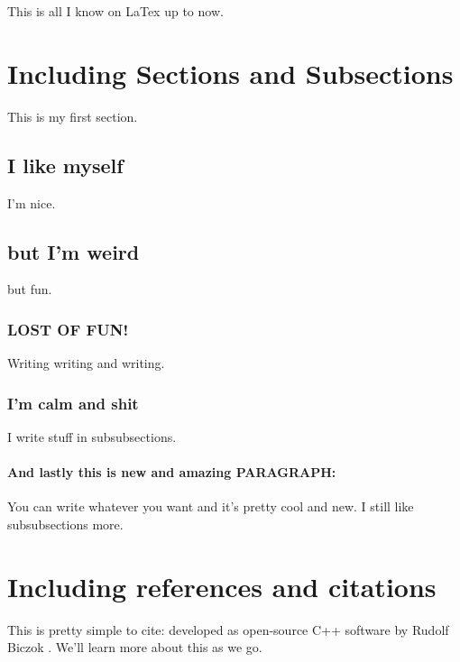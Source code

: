 

\label{chap:howtodo}
This is all I know on LaTex up to now.

\section{Including Sections and Subsections}
This is my first section.

\subsection{I like myself}
I'm nice.

\subsection{but I'm weird}
but fun.

\subsubsection{LOST OF FUN!}
Writing writing and writing.

\subsubsection{I'm calm and shit}
I write stuff in subsubsections.

\paragraph*{And lastly this is new and amazing PARAGRAPH:} You can write whatever you want and it's pretty cool and new. I still like subsubsections more. 

\section{Including references and citations}
This is pretty simple to cite: developed as open-source C++ software by Rudolf Biczok \cite{paraunity}.
We'll learn more about this as we go.


